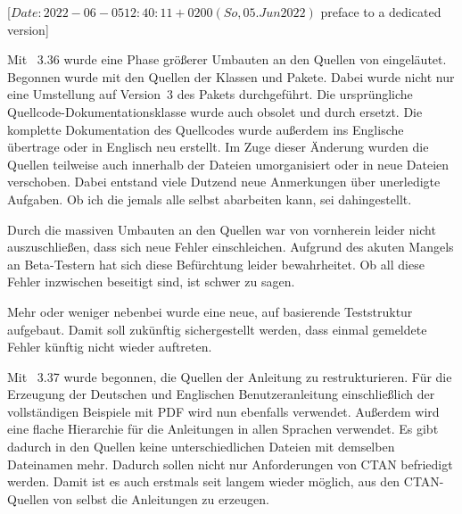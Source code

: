 %
%
%
%
%

                 [$Date: 2022-06-05 12:40:11 +0200 (So, 05. Jun 2022) $
                  preface to a dedicated version]


Mit \KOMAScript~3.36 wurde eine Phase größerer Umbauten an den Quellen von
\KOMAScript{} eingeläutet. Begonnen wurde mit den Quellen der Klassen und
Pakete. Dabei wurde nicht nur eine Umstellung auf Version~3 des Pakets
 durchgeführt. Die ursprüngliche Quellcode-Dokumentationsklasse
 wurde auch obsolet und durch 
ersetzt. Die komplette Dokumentation des Quellcodes wurde außerdem ins
Englische übertrage oder in Englisch neu erstellt. Im Zuge dieser Änderung
wurden die Quellen teilweise auch innerhalb der Dateien umorganisiert oder in
neue Dateien verschoben. Dabei entstand viele Dutzend neue Anmerkungen über
unerledigte Aufgaben. Ob ich die jemals alle selbst abarbeiten
kann, sei dahingestellt.

Durch die massiven Umbauten an den Quellen war von vornherein leider nicht
auszuschließen, dass sich neue Fehler einschleichen. Aufgrund des akuten
Mangels an Beta-Testern hat sich diese Befürchtung leider bewahrheitet. Ob all
diese Fehler inzwischen beseitigt sind, ist schwer zu sagen.

Mehr oder weniger nebenbei wurde eine neue, auf  basierende
Teststruktur aufgebaut. Damit soll zukünftig sichergestellt werden, dass
einmal gemeldete Fehler künftig nicht wieder auftreten.

Mit \KOMAScript~3.37 wurde begonnen, die Quellen der Anleitung zu
restrukturieren. Für die Erzeugung der Deutschen und Englischen
Benutzeranleitung einschließlich der vollständigen Beispiele mit PDF wird nun
ebenfalls  verwendet. Außerdem wird eine flache Hierarchie
für die Anleitungen in allen Sprachen verwendet. Es gibt dadurch in den
Quellen keine unterschiedlichen Dateien mit demselben Dateinamen
mehr. Dadurch sollen nicht nur Anforderungen von CTAN befriedigt werden. Damit
ist es auch erstmals seit langem wieder möglich, aus den CTAN-Quellen von
\KOMAScript{} selbst die Anleitungen zu erzeugen.

